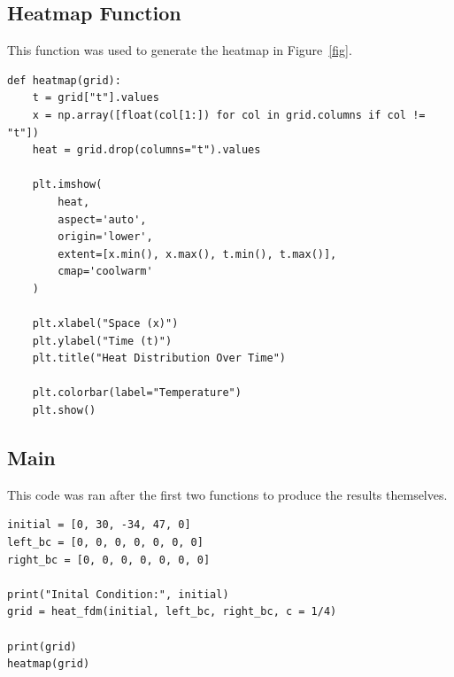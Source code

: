 \documentclass[12pt,letterpaper,reqno]{amsart}
\theoremstyle{definition}
\numberwithin{thm}{section}
\theoremstyle{remark}
\begin{document}
\subsection{Heatmap Function}
This function was used to generate the heatmap in Figure~\ref{fig}.\\

\begin{verbatim}
def heatmap(grid): 
    t = grid["t"].values
    x = np.array([float(col[1:]) for col in grid.columns if col != "t"])
    heat = grid.drop(columns="t").values

    plt.imshow(
        heat,
        aspect='auto',
        origin='lower',
        extent=[x.min(), x.max(), t.min(), t.max()],
        cmap='coolwarm'
    )

    plt.xlabel("Space (x)")
    plt.ylabel("Time (t)")
    plt.title("Heat Distribution Over Time")

    plt.colorbar(label="Temperature")
    plt.show()
\end{verbatim}

\subsection{Main}
This code was ran after the first two functions to produce the results themselves.\\

\begin{verbatim}
initial = [0, 30, -34, 47, 0]
left_bc = [0, 0, 0, 0, 0, 0, 0]
right_bc = [0, 0, 0, 0, 0, 0, 0]

print("Inital Condition:", initial)
grid = heat_fdm(initial, left_bc, right_bc, c = 1/4)

print(grid)
heatmap(grid)
\end{verbatim}
\end{document}
